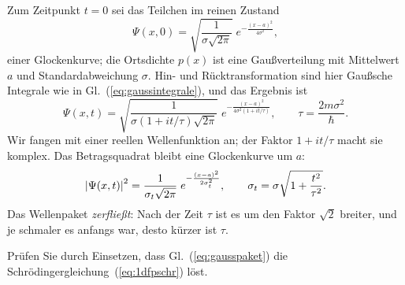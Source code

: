 
\begin{beispiel}
	Zum Zeitpunkt $t=0$ sei das Teilchen im reinen Zustand
	\begin{equation}
		\Psi(x,0) = \sqrt{\frac{1}{\sigma\sqrt{2\pi}}}\;e^{-\frac{(x-a)^2}{4\sigma^2}},
	\end{equation}
	einer Glockenkurve; die Ortsdichte $p(x)$ ist eine Gaußverteilung mit Mittelwert $a$ und Standardabweichung $\sigma$. Hin- und Rücktransformation sind hier Gaußsche Integrale wie in Gl.~(\ref{eq:gaussintegrale}), und das Ergebnis ist
	\begin{equation}\label{eq:gausspaket}
		\Psi(x,t) = \sqrt{\frac{1}{\sigma\left(1+it/\tau\right)\sqrt{2\pi}}}\;e^{-\frac{(x-a)^2}{4\sigma^2\left(1+it/\tau\right)}}, \qquad \tau = \frac{2m\sigma^2}{\hbar}.
	\end{equation}
	Wir fangen mit einer reellen Wellenfunktion an; der Faktor $1+it/\tau$ macht sie komplex. Das Betragsquadrat bleibt eine Glockenkurve um $a$:
	\begin{equation}
		\left\lvert \Psi(x,t) \right\rvert^2 = \frac{1}{\sigma_t\sqrt{2\pi}}\;e^{-\frac{(x-a)^2}{2\sigma_t^2}}, \qquad \sigma_t = \sigma\sqrt{1+\frac{t^2}{\tau^2}}.
	\end{equation}
	Das Wellenpaket \emph{zerfließt}: Nach der Zeit $\tau$ ist es um den Faktor $\sqrt2$ breiter, und je schmaler es anfangs war, desto kürzer ist $\tau$.
\end{beispiel}

\begin{übung}
	Prüfen Sie durch Einsetzen, dass Gl.~(\ref{eq:gausspaket}) die Schrödingergleichung~(\ref{eq:1dfpschr}) löst.
\end{übung}

